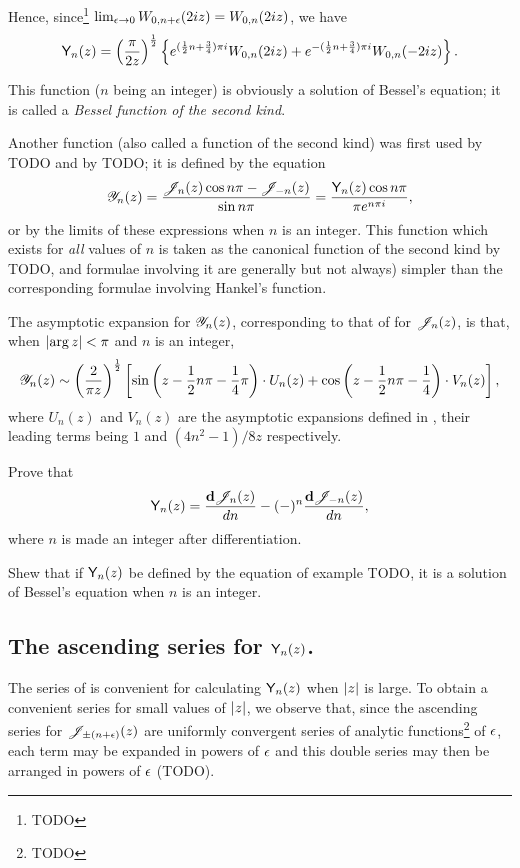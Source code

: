\documentclass{book}
\begin{document}
Hence, since\footnote{TODO}
$\lim_{\epsilon\rightarrow 0} W_{0,n+\epsilon}(2iz) = W_{0,n}(2iz)$, we
have
$$
\mathsf{Y}_n(z)
=
\left(  \frac{\pi}{2z}  \right)^{\frac{1}{2}}
\left\{ 
  e^{(\frac{1}{2} n + \frac{3}{4}) \pi i} W_{0,n}(2iz)
  +
  e^{-(\frac{1}{2} n + \frac{3}{4})\pi i} W_{0,n}(-2iz)
 \right\}.
$$

This function ($n$ being an integer) is obviously a solution of
Bessel's equation; it is called a \emph{Bessel function of the
  second kind}.

Another function (also called a function of the second kind) was
first used by TODO and by TODO; it is defined by the equation
$$
\mathscr{Y}_n(z) = \frac{\mathscr{J}_n(z) \cos n\pi - \mathscr{J}_{-n}(z)}{\sin n\pi}
= \frac{\mathsf{Y}_n(z) \cos n\pi}{\pi e^{n\pi i}},
$$
% 
% 
or by the limits of these expressions when $n$ is an integer. This
function which exists for \emph{all} values of $n$ is taken as the
canonical function of the second kind by TODO, and formulae
involving it are generally but not always) simpler than the
corresponding formulae involving Hankel's function.

The asymptotic expansion for $\mathscr{Y}_n(z)$, corresponding to that of
 for $\mathscr{J}_n(z)$, is that, when
$\left| \arg z \right| < \pi$ and $n$ is an integer,
$$
\mathscr{Y}_n(z)
\sim
\left(  \frac{2}{\pi z}  \right)^{\frac{1}{2}}
\left[  \sin\left( z - \frac{1}{2} n \pi - \frac{1}{4} \pi \right)
  \cdot U_n(z)
  + \cos\left( z - \frac{1}{2} n \pi - \frac{1}{4} \right) \cdot V_n(z)
 \right],
$$
where $U_n(z)$ and $V_n(z)$ are the asymptotic expansions defined
in , their leading terms being $1$ and
$(4n^2-1)/8z$ respectively.
\begin{wandwexample}
  Prove that
  $$
  \mathsf{Y}_n(z)
  =
  \frac{\mathbf{d}\mathscr{J}_n(z)}{dn}
  -
  (-)^n \frac{\mathbf{d}\mathscr{J}_{-n}(z)}{dn},
  $$
  where $n$ is made an integer after differentiation.
\end{wandwexample}
\begin{wandwexample}
  Shew that if $\mathsf{Y}_n(z)$ be defined by the equation of example
  TODO, it is a solution of Bessel's equation when $n$ is an integer.
\end{wandwexample}
\subsection{The ascending series for $\mathsf{Y}_n(z)$.}
The series of  is convenient for calculating
$\mathsf{Y}_n(z)$ when $\left| z \right|$ is large. To obtain a convenient
series for small values of $\left| z \right|$, we observe that, since
the ascending series for $\mathscr{J}_{\pm (n+\epsilon)}(z)$ are uniformly
convergent series of analytic functions\footnote{TODO} of $\epsilon$,
each term may be expanded in powers of $\epsilon$ and this double
series may then be arranged in powers of
$\epsilon$ (TODO).
\end{document}
